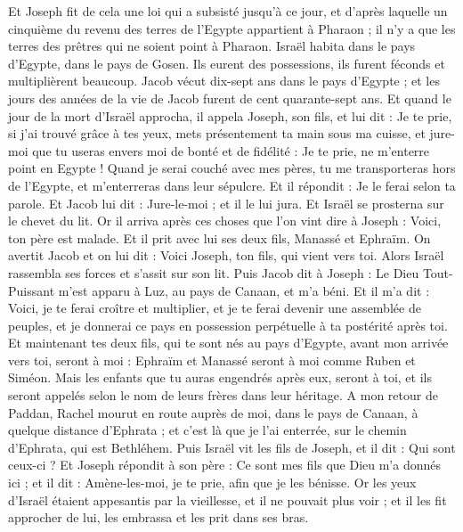 \begin{multicols}{2}
Et Joseph fit de cela une loi qui a subsisté jusqu'à ce jour, et d'après laquelle un cinquième du revenu des terres de l'Egypte appartient à Pharaon ; il n'y a que les terres des prêtres qui ne soient point à Pharaon.
Israël habita dans le pays d'Egypte, dans le pays de Gosen. Ils eurent des possessions, ils furent féconds et multiplièrent beaucoup.
Jacob vécut dix-sept ans dans le pays d'Egypte ; et les jours des années de la vie de Jacob furent de cent quarante-sept ans.
Et quand le jour de la mort d'Israël approcha, il appela Joseph, son fils, et lui dit : Je te prie, si j'ai trouvé grâce à tes yeux, mets présentement ta main sous ma cuisse, et jure-moi que tu useras envers moi de bonté et de fidélité : Je te prie, ne m'enterre point en Egypte !
Quand je serai couché avec mes pères, tu me transporteras hors de l'Egypte, et m'enterreras dans leur sépulcre. Et il répondit : Je le ferai selon ta parole.
Et Jacob lui dit : Jure-le-moi ; et il le lui jura. Et Israël se prosterna sur le chevet du lit.
\VerseOne{}Or il arriva après ces choses que l'on vint dire à Joseph : Voici, ton père est malade. Et il prit avec lui ses deux fils, Manassé et Ephraïm.
On avertit Jacob et on lui dit : Voici Joseph, ton fils, qui vient vers toi. Alors Israël rassembla ses forces et s'assit sur son lit.
Puis Jacob dit à Joseph : Le Dieu Tout-Puissant m'est apparu à Luz, au pays de Canaan, et m'a béni.
Et il m'a dit : Voici, je te ferai croître et multiplier, et je te ferai devenir une assemblée de peuples, et je donnerai ce pays en possession perpétuelle à ta postérité après toi.
Et maintenant tes deux fils, qui te sont nés au pays d'Egypte, avant mon arrivée vers toi, seront à moi : Ephraïm et Manassé seront à moi comme Ruben et Siméon.
Mais les enfants que tu auras engendrés après eux, seront à toi, et ils seront appelés selon le nom de leurs frères dans leur héritage.
A mon retour de Paddan, Rachel mourut en route auprès de moi, dans le pays de Canaan, à quelque distance d'Ephrata ; et c'est là que je l'ai enterrée, sur le chemin d'Ephrata, qui est Bethléhem.
Puis Israël vit les fils de Joseph, et il dit : Qui sont ceux-ci ?
Et Joseph répondit à son père : Ce sont mes fils que Dieu m'a donnés ici ; et il dit : Amène-les-moi, je te prie, afin que je les bénisse.
Or les yeux d'Israël étaient appesantis par la vieillesse, et il ne pouvait plus voir ; et il les fit approcher de lui, les embrassa et les prit dans ses bras.

\end{multicols}
